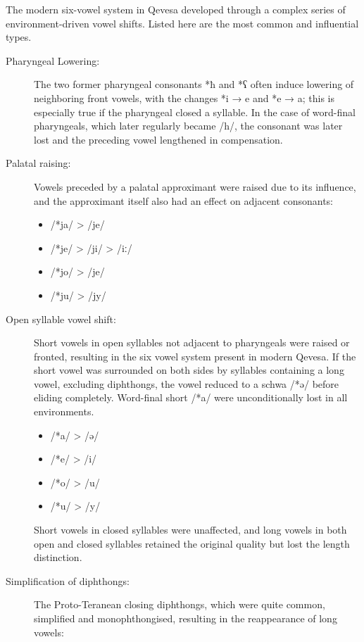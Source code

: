 \documentclass[grammar]{subfiles}
\begin{document}
The modern six-vowel system in Qevesa developed through a complex series of
environment-driven vowel shifts.  Listed here are the most common and
influential types.

\begin{description} 
  \item[Pharyngeal Lowering:] The two former pharyngeal consonants *ħ and *ʕ
    often induce lowering of neighboring front vowels, with the changes *i → e
    and *e → a; this is especially true if the pharyngeal closed a syllable.
    In the case of word-final pharyngeals, which later regularly became /h/,
    the consonant was later lost and the preceding vowel lengthened in
    compensation.

  \item[Palatal raising:] Vowels preceded by a palatal approximant were raised
    due to its influence, and the approximant itself also had an effect on
    adjacent consonants:

    \begin{itemize}
      \item /*ja/ > /je/
      \item /*je/ > /ji/ > /iː/
      \item /*jo/ > /je/
      \item /*ju/ > /jy/
    \end{itemize}

  \item[Open syllable vowel shift:] Short vowels in open syllables not adjacent
    to pharyngeals were raised or fronted, resulting in the six vowel system
    present in modern Qevesa. If the short vowel was surrounded on both sides
    by syllables containing a long vowel, excluding diphthongs, the vowel
    reduced to a schwa /*ə/ before eliding completely.  Word-final short /*a/
    were unconditionally lost in all environments.

    \begin{itemize}
      \item /*a/ > /ə/ 
      \item /*e/ > /i/
      \item /*o/ > /u/
      \item /*u/ > /y/
    \end{itemize}

    Short vowels in closed syllables were unaffected, and long vowels in both
    open and closed syllables retained the original quality but lost the length
    distinction.   

  \item[Simplification of diphthongs:] The Proto-Teranean closing diphthongs,
    which were quite common, simplified and monophthongised, resulting in the
    reappearance of long vowels:  


\end{description}
\end{document}

